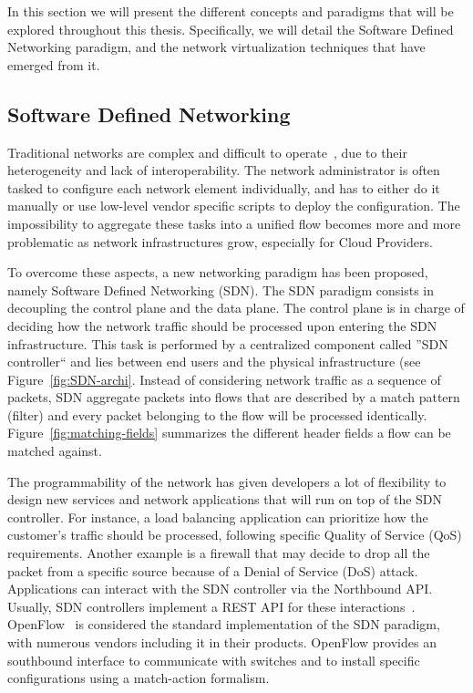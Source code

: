 In this section we will present the different concepts and paradigms that will be explored throughout this thesis.
Specifically, we will detail the Software Defined Networking paradigm, and the network virtualization techniques that have emerged from it.

\subsection{Software Defined Networking}

Traditional networks are complex and difficult to operate~\cite{complexnetworks}, due to their heterogeneity and lack of interoperability. The network administrator is often tasked to configure each network element individually, and has to either do it manually or use low-level vendor specific scripts to deploy the configuration. The impossibility to aggregate these tasks into a unified flow becomes more and more problematic as network infrastructures grow, especially for Cloud Providers.

To overcome these aspects, a new networking paradigm has been proposed, namely Software Defined Networking (SDN).
The SDN paradigm consists in decoupling the control plane and the data plane.
The control plane is in charge of deciding how the network traffic should be processed upon entering the SDN infrastructure.
This task is performed by a centralized component called ''SDN controller`` and lies between end users and the physical infrastructure (see Figure~\ref{fig:SDN-archi}. Instead of considering network traffic as a sequence of packets, SDN aggregate packets into flows that are described by a match pattern (filter) and every packet belonging to the flow will be processed identically. Figure~\ref{fig:matching-fields} summarizes the different header fields a flow can be matched against.



The programmability of the network has given developers a lot of flexibility to design new services and network applications that will run on top of the SDN controller.
For instance, a load balancing application can prioritize how the customer's traffic should be processed, following specific Quality of Service (QoS) requirements.
Another example is a firewall that may decide to drop all the packet from a specific source because of a Denial of Service (DoS) attack.
Applications can interact with the SDN controller via the Northbound API.
Usually, SDN controllers implement a REST API for these interactions~\cite{onos-Berde2014a,opendaylight,floodlight}.
OpenFlow~\cite{Openflow-McKeown2008} is considered the standard implementation of the SDN paradigm, with numerous vendors including it in their products.
OpenFlow provides an southbound interface to communicate with switches and to install specific configurations using a match-action formalism.

